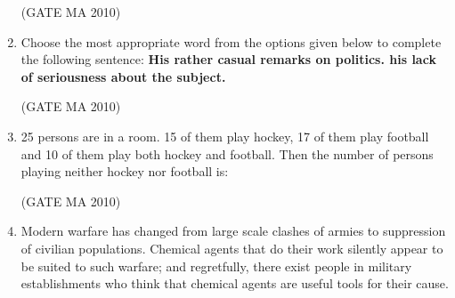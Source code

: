 \documentclass[journal,12pt,onecolumn]{IEEEtran}
\theoremstyle{remark}
\begin{document}
\begin{flushleft}
\begin{enumerate}
\hfill(GATE MA 2010)

\begin{enumerate}
\end{enumerate}

\item Choose the most appropriate word from the options given below to complete the following sentence: 
\textbf{His rather casual remarks on politics\underline{\hspace{2cm}}. his lack of seriousness about the subject.}

\hfill(GATE MA 2010)

\begin{enumerate}
\end{enumerate}

\item 25 persons are in a room. 15 of them play hockey, 17 of them play football and 10 of them play both hockey and football. Then the number of persons playing neither hockey nor football is:

\hfill(GATE MA 2010)

\begin{enumerate}
\end{enumerate}
\item Modern warfare has changed from large scale clashes of armies to suppression of civilian populations. Chemical agents that do their work silently appear to be suited to such warfare; and regretfully, there exist people in military establishments who think that chemical agents are useful tools for their cause. 


\end{enumerate}
\end{flushleft}
\end{document}
